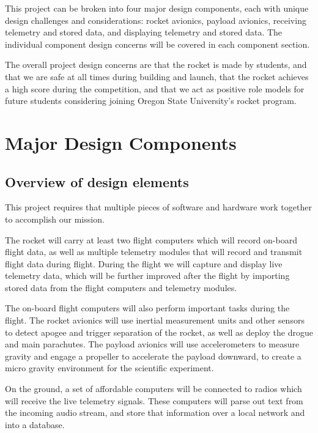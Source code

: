 \documentclass[onecolumn, draftclsnofoot, 10pt, compsoc]{IEEEtran}
\begin{document}
This project can be broken into four major design components, each with unique design challenges and considerations: rocket avionics, payload avionics, receiving telemetry and stored data, and displaying telemetry and stored data.  The individual component design concerns will be covered in each component section.

The overall project design concerns are that the rocket is made by students, and that we are safe at all times during building and launch, that the rocket achieves a high score during the competition, and that we act as positive role models for future students considering joining Oregon State University's rocket program.


\section{Major Design Components}

\subsection{Overview of design elements}

This project requires that multiple pieces of software and hardware work together to accomplish our mission.

The rocket will carry at least two flight computers which will record on-board flight data, as well as multiple telemetry modules that will record and transmit flight data during flight.  During the flight we will capture and display live telemetry data, which will be further improved after the flight by importing stored data from the flight computers and telemetry modules.

The on-board flight computers will also perform important tasks during the flight.  The rocket avionics will use inertial measurement units and other sensors to detect apogee and trigger separation of the rocket, as well as deploy the drogue and main parachutes.  The payload avionics will use accelerometers to measure gravity and engage a propeller to accelerate the payload downward, to create a micro gravity environment for the scientific experiment.

On the ground, a set of affordable computers will be connected to radios which will receive the live telemetry signals.  These computers will parse out text from the incoming audio stream, and store that information over a local network and into a database.
\end{document}
